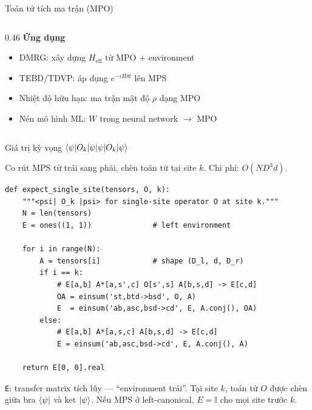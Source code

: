 \documentclass[aspectratio=169, 11pt]{beamer}
\begin{document}
\begin{frame}[shrink=3]{Toán tử tích ma trận (MPO)}
\begin{columns}[T]
\begin{column}{0.46\textwidth}
\vspace{8pt}
\textcolor{qamber}{\textbf{Ứng dụng}}\\[2pt]
{\small
\begin{itemize}
  \item DMRG: xây dựng $H_\text{eff}$ từ MPO + environment
  \item TEBD/TDVP: áp dụng $e^{-iH\delta t}$ lên MPS
  \item Nhiệt độ hữu hạn: ma trận mật độ $\rho$ dạng MPO
  \item Nén mô hình ML: $W$ trong neural network $\to$ MPO
\end{itemize}}

\end{column}
\end{columns}

\end{frame}

\begin{frame}[fragile, shrink=3]{Giá trị kỳ vọng $\braket{\psi|O_k|\psi}$}

{\small Co rút MPS từ trái sang phải, chèn toán tử tại site $k$. Chi phí: $O(ND^3 d)$.}

\vspace{4pt}
\begin{lstlisting}
def expect_single_site(tensors, O, k):
    """<psi| O_k |psi> for single-site operator O at site k."""
    N = len(tensors)
    E = ones((1, 1))              # left environment

    for i in range(N):
        A = tensors[i]            # shape (D_l, d, D_r)
        if i == k:
            # E[a,b] A*[a,s',c] O[s',s] A[b,s,d] -> E[c,d]
            OA = einsum('st,btd->bsd', O, A)
            E  = einsum('ab,asc,bsd->cd', E, A.conj(), OA)
        else:
            # E[a,b] A*[a,s,c] A[b,s,d] -> E[c,d]
            E = einsum('ab,asc,bsd->cd', E, A.conj(), A)

    return E[0, 0].real
\end{lstlisting}

\vspace{4pt}
{\small\textcolor{dimtext}{%
\texttt{E}: transfer matrix tích lũy — ``environment trái''. Tại site $k$, toán tử $O$ được chèn giữa bra $\bra{\psi}$ và ket $\ket{\psi}$.
Nếu MPS ở left-canonical, $E = \mathbb{I}$ cho mọi site trước $k$.}}

\end{frame}
\end{document}
